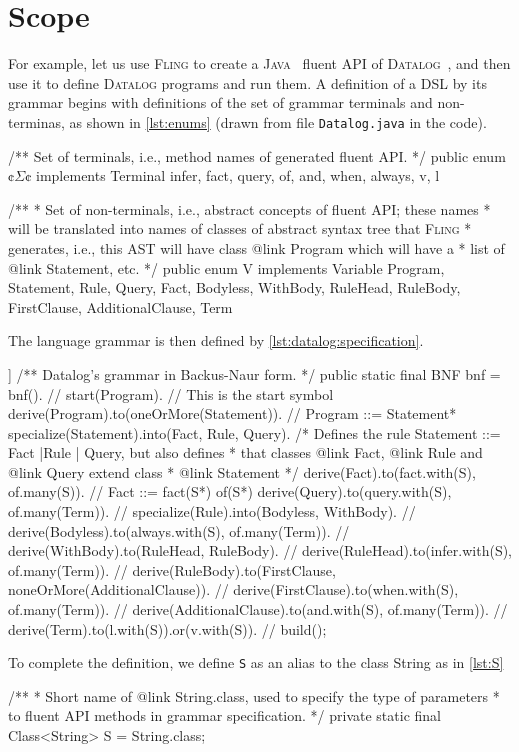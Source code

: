 \documentclass[a4paper,UKenglish,cleveref, autoref]{darts-v2019}
\newcommand{\Fling}{F\textsc{ling}\xspace}
\newcommand{\Java}{\textsc{Java}\xspace}
\newcommand{\Datalog}{\textsc{Datalog}\xspace}
\newenvironment{scope}{\section{Scope}}{}
\begin{document}
\begin{scope}
For example, let us use \Fling to create a \Java~\cite{Arnold:Gosling:96} fluent API of \Datalog~\cite{Ceri:Gottlob:Tanca:90}, and then
use it to define \Datalog programs and run them.
A definition of a DSL by its grammar begins with definitions of the set of
grammar terminals and non-terminas, as shown in \cref{lst:enums} (drawn from file
\texttt{Datalog.java} in the code).
\begin{excerpt}[language=java,label={lst:enums},caption=
  {Terminals and non-terminals for \Datalog grammar}
]
/** Set of terminals, i.e., method names of generated fluent API. */
public enum ¢$\Sigma$¢ implements Terminal {
  infer, fact, query, of, and, when, always, v, l
}

/**
* Set of non-terminals, i.e., abstract concepts of fluent API; these names
* will be translated into names of classes of abstract syntax tree that \Fling
* generates, i.e., this AST will have class {@link Program} which will have a
* list of {@link Statement}, etc.
*/
public enum V implements Variable {
  Program, Statement, Rule, Query, Fact, Bodyless, WithBody,
  RuleHead, RuleBody, FirstClause, AdditionalClause, Term
}
\end{excerpt}
The language grammar is then defined by
\cref{lst:datalog:specification}.

\begin{excerpt}[language=java,label={lst:datalog:specification},caption={\Datalog BNF}]]
/** Datalog's grammar in Backus-Naur form. */
public static final BNF bnf = bnf(). //
  start(Program). // This is the start symbol
  derive(Program).to(oneOrMore(Statement)). // Program ::= Statement*
  specialize(Statement).into(Fact, Rule, Query).
  /* Defines the rule Statement ::= Fact |Rule | Query, but also defines
   * that classes {@link Fact}, {@link Rule} and {@link Query} extend class
   * {@link Statement} */
  derive(Fact).to(fact.with(S), of.many(S)). // Fact ::= fact(S*) of(S*)
  derive(Query).to(query.with(S), of.many(Term)). //
  specialize(Rule).into(Bodyless, WithBody). //
  derive(Bodyless).to(always.with(S), of.many(Term)). //
  derive(WithBody).to(RuleHead, RuleBody). //
  derive(RuleHead).to(infer.with(S), of.many(Term)). //
  derive(RuleBody).to(FirstClause, noneOrMore(AdditionalClause)). //
  derive(FirstClause).to(when.with(S), of.many(Term)). //
  derive(AdditionalClause).to(and.with(S), of.many(Term)). //
  derive(Term).to(l.with(S)).or(v.with(S)). //
  build();
\end{excerpt}
To complete the definition, we define \texttt{S} as an alias to
the class String as in \cref{lst:S}
\begin{excerpt}[language=java,label={lst:S},caption=
    {A definition of \texttt{S} is required for \cref{lst:datalog:specification}}
]
/**
 * Short name of {@link String}.class, used to specify the type of parameters
 * to fluent API methods in grammar specification.
 */
private static final Class<String> S = String.class;
\end{excerpt}


\end{scope}
\end{document}
